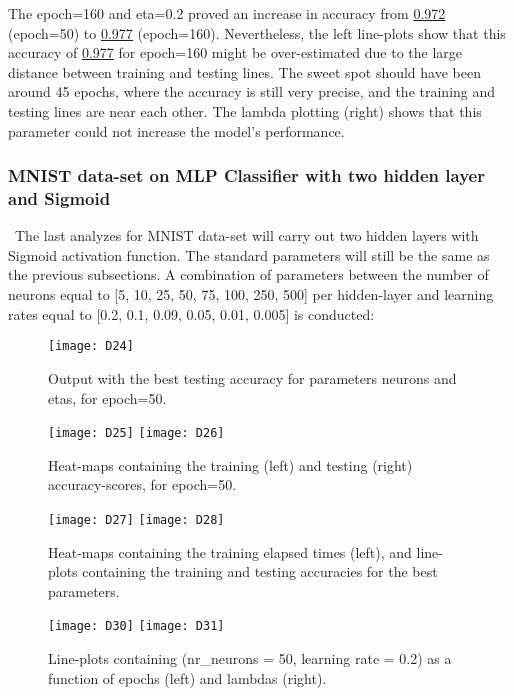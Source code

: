 The epoch=160 and eta=0.2 proved an increase in accuracy from \hyperref[fig:D10]{0.972} (epoch=50) to \hyperref[fig:D14]{0.977} (epoch=160). Nevertheless, the left line-plots show that this accuracy of \hyperref[fig:D14]{0.977} for epoch=160 might be over-estimated due to the large distance between training and testing lines. The sweet spot should have been around 45 epochs, where the accuracy is still very precise, and the training and testing lines are near each other. The lambda plotting (right) shows that this parameter could not increase the model's performance.

\subsubsection{MNIST data-set on MLP Classifier with two hidden layer and Sigmoid}
\label{chap:MNIST data-set on MLP Classifier with two hidden layer and Sigmoid}

\quad \, The last analyzes for MNIST data-set will carry out two hidden layers with Sigmoid activation function. The standard parameters will still be the same as the previous subsections. A combination of parameters between the number of neurons equal to [5, 10, 25, 50, 75, 100, 250, 500] per hidden-layer and learning rates equal to [0.2, 0.1, 0.09, 0.05, 0.01, 0.005] is conducted:

\begin{figure}[H]
\label{fig:D15}
\centering
\texttt{[image: D24]}
\caption{Output with the best testing accuracy for parameters neurons and etas, for epoch=50.}
\end{figure}

\begin{figure}[H]
\label{fig:D16}
\centering
\texttt{[image: D25]}
\texttt{[image: D26]}
\caption{Heat-maps containing the training (left) and testing (right) accuracy-scores, for epoch=50.}
\end{figure}

\begin{figure}[H]
\label{fig:D17}
\centering
\texttt{[image: D27]}
\texttt{[image: D28]}
\caption{Heat-maps containing the training elapsed times (left), and line-plots containing the training and testing accuracies for the best parameters.}
\end{figure}

\begin{figure}[H]
\label{fig:D19}
\centering
\texttt{[image: D30]}
\texttt{[image: D31]}
\caption{Line-plots containing (nr\_neurons = 50, learning rate = 0.2) as a function of epochs (left) and lambdas (right).}
\end{figure}

